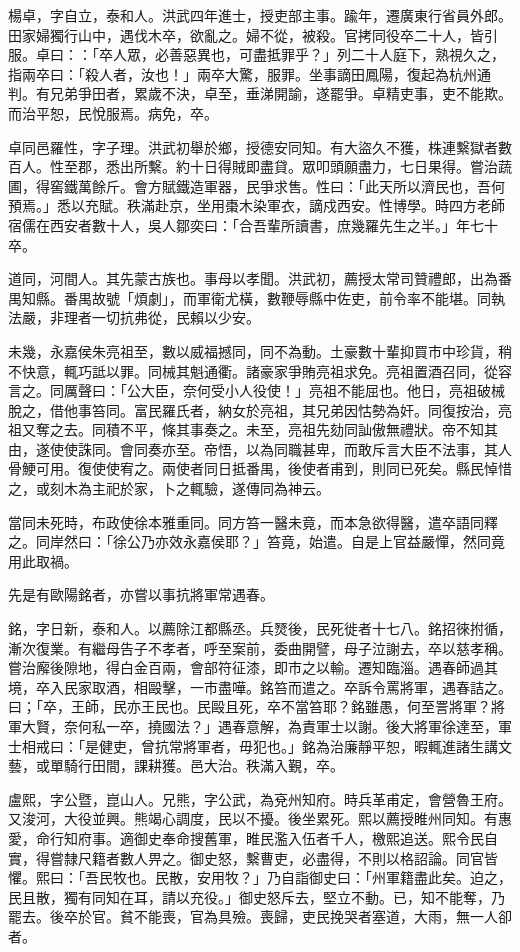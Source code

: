 \begin{pinyinscope}
楊卓，字自立，泰和人。洪武四年進士，授吏部主事。踰年，遷廣東行省員外郎。田家婦獨行山中，遇伐木卒，欲亂之。婦不從，被殺。官拷同役卒二十人，皆引服。卓曰：：「卒人眾，必善惡異也，可盡抵罪乎？」列二十人庭下，熟視久之，指兩卒曰：「殺人者，汝也！」兩卒大驚，服罪。坐事謫田鳳陽，復起為杭州通判。有兄弟爭田者，累歲不決，卓至，垂涕開諭，遂罷爭。卓精吏事，吏不能欺。而治平恕，民悅服焉。病免，卒。

卓同邑羅性，字子理。洪武初舉於鄉，授德安同知。有大盜久不獲，株連繫獄者數百人。性至郡，悉出所繫。約十日得賊即盡貸。眾叩頭願盡力，七日果得。嘗治蔬圃，得窖鐵萬餘斤。會方賦鐵造軍器，民爭求售。性曰：「此天所以濟民也，吾何預焉。」悉以充賦。秩滿赴京，坐用棗木染軍衣，謫戍西安。性博學。時四方老師宿儒在西安者數十人，吳人鄒奕曰：「合吾輩所讀書，庶幾羅先生之半。」年七十卒。

道同，河間人。其先蒙古族也。事母以孝聞。洪武初，薦授太常司贊禮郎，出為番禺知縣。番禺故號「煩劇」，而軍衛尤橫，數鞭辱縣中佐吏，前令率不能堪。同執法嚴，非理者一切抗弗從，民賴以少安。

未幾，永嘉侯朱亮祖至，數以威福撼同，同不為動。土豪數十輩抑買市中珍貨，稍不快意，輒巧詆以罪。同械其魁通衢。諸豪家爭賄亮祖求免。亮祖置酒召同，從容言之。同厲聲曰：「公大臣，奈何受小人役使！」亮祖不能屈也。他日，亮祖破械脫之，借他事笞同。富民羅氏者，納女於亮祖，其兄弟因怙勢為奸。同復按治，亮祖又奪之去。同積不平，條其事奏之。未至，亮祖先劾同訕傲無禮狀。帝不知其由，遂使使誅同。會同奏亦至。帝悟，以為同職甚卑，而敢斥言大臣不法事，其人骨鯁可用。復使使宥之。兩使者同日抵番禺，後使者甫到，則同已死矣。縣民悼惜之，或刻木為主祀於家，卜之輒驗，遂傳同為神云。

當同未死時，布政使徐本雅重同。同方笞一醫未竟，而本急欲得醫，遣卒語同釋之。同岸然曰：「徐公乃亦效永嘉侯耶？」笞竟，始遣。自是上官益嚴憚，然同竟用此取禍。

先是有歐陽銘者，亦嘗以事抗將軍常遇春。

銘，字日新，泰和人。以薦除江都縣丞。兵燹後，民死徙者十七八。銘招徠拊循，漸次復業。有繼母告子不孝者，呼至案前，委曲開譬，母子泣謝去，卒以慈孝稱。嘗治廨後隙地，得白金百兩，會部符征漆，即市之以輸。遷知臨淄。遇春師過其境，卒入民家取酒，相毆擊，一市盡嘩。銘笞而遣之。卒訴令罵將軍，遇春詰之。曰；「卒，王師，民亦王民也。民毆且死，卒不當笞耶？銘雖愚，何至詈將軍？將軍大賢，奈何私一卒，撓國法？」遇春意解，為責軍士以謝。後大將軍徐達至，軍士相戒曰：「是健吏，曾抗常將軍者，毋犯也。」銘為治廉靜平恕，暇輒進諸生講文藝，或單騎行田間，課耕獲。邑大治。秩滿入覲，卒。

盧熙，字公暨，崑山人。兄熊，字公武，為兗州知府。時兵革甫定，會營魯王府。又浚河，大役並興。熊竭心調度，民以不擾。後坐累死。熙以薦授睢州同知。有惠愛，命行知府事。適御史奉命搜舊軍，睢民濫入伍者千人，檄熙追送。熙令民自實，得嘗隸尺籍者數人畀之。御史怒，繫曹吏，必盡得，不則以格詔論。同官皆懼。熙曰：「吾民牧也。民散，安用牧？」乃自詣御史曰：「州軍籍盡此矣。迫之，民且散，獨有同知在耳，請以充役。」御史怒斥去，堅立不動。已，知不能奪，乃罷去。後卒於官。貧不能喪，官為具殮。喪歸，吏民挽哭者塞道，大雨，無一人卻者。


\end{pinyinscope}
